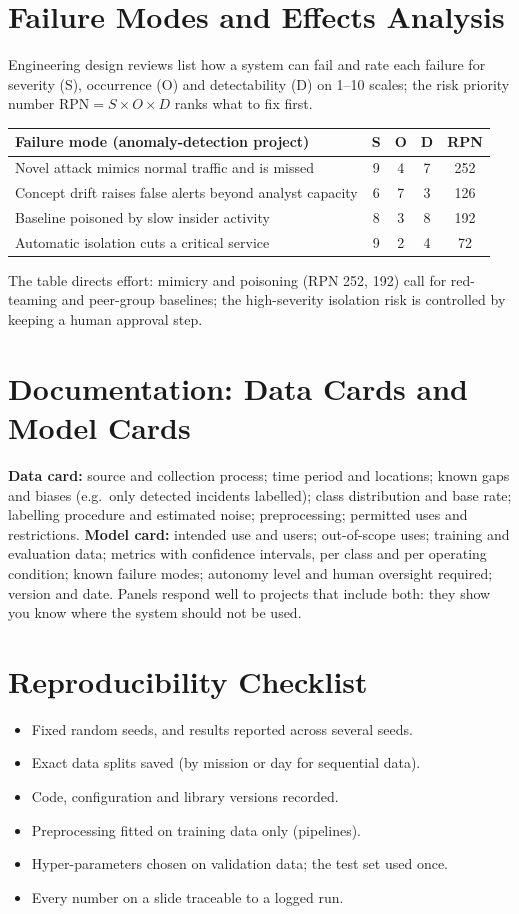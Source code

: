 \documentclass[11pt]{article}
\begin{document}
\section{Failure Modes and Effects Analysis}
Engineering design reviews list how a system can fail and rate each failure for severity (S), occurrence (O) and detectability (D) on 1--10 scales; the risk priority number $\text{RPN}=S\times O\times D$ ranks what to fix first.
\begin{center}\small\renewcommand{\arraystretch}{1.25}
\begin{tabularx}{\textwidth}{Xcccc}\toprule Failure mode (anomaly-detection project) & S & O & D & RPN\\\midrule Novel attack mimics normal traffic and is missed & 9 & 4 & 7 & 252\\ Concept drift raises false alerts beyond analyst capacity & 6 & 7 & 3 & 126\\ Baseline poisoned by slow insider activity & 8 & 3 & 8 & 192\\ Automatic isolation cuts a critical service & 9 & 2 & 4 & 72\\\bottomrule\end{tabularx}\end{center}
The table directs effort: mimicry and poisoning (RPN 252, 192) call for red-teaming and peer-group baselines; the high-severity isolation risk is controlled by keeping a human approval step.

\section{Documentation: Data Cards and Model Cards}
\textbf{Data card:} source and collection process; time period and locations; known gaps and biases (e.g.\ only detected incidents labelled); class distribution and base rate; labelling procedure and estimated noise; preprocessing; permitted uses and restrictions. \textbf{Model card:} intended use and users; out-of-scope uses; training and evaluation data; metrics with confidence intervals, per class and per operating condition; known failure modes; autonomy level and human oversight required; version and date. Panels respond well to projects that include both: they show you know where the system should not be used.

\section{Reproducibility Checklist}
\begin{itemize}
\item Fixed random seeds, and results reported across several seeds.
\item Exact data splits saved (by mission or day for sequential data).
\item Code, configuration and library versions recorded.
\item Preprocessing fitted on training data only (pipelines).
\item Hyper-parameters chosen on validation data; the test set used once.
\item Every number on a slide traceable to a logged run.
\end{itemize}
\end{document}
